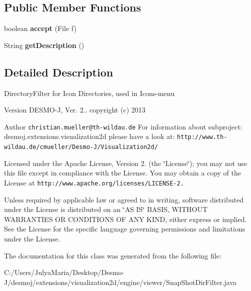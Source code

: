 \subsection*{Public Member Functions}
\begin{DoxyCompactItemize}
\item 
boolean {\bfseries accept} (File f)\label{classdesmoj_1_1extensions_1_1visualization2d_1_1engine_1_1viewer_1_1_snap_shot_dir_filter_abe949b1113d24862002284462e9a185e}

\item 
String {\bfseries get\-Description} ()\label{classdesmoj_1_1extensions_1_1visualization2d_1_1engine_1_1viewer_1_1_snap_shot_dir_filter_a44fd23ae6b5a6d161ec1302931feec11}

\end{DoxyCompactItemize}


\subsection{Detailed Description}
Directory\-Filter for Icon Directories, used in Icons-\/menu

\begin{DoxyVersion}{Version}
D\-E\-S\-M\-O-\/\-J, Ver. 2.. copyright (c) 2013 
\end{DoxyVersion}
\begin{DoxyAuthor}{Author}
{\tt christian.\-mueller@th-\/wildau.\-de} For information about subproject\-: desmoj.\-extensions.\-visualization2d please have a look at\-: {\tt http\-://www.\-th-\/wildau.\-de/cmueller/\-Desmo-\/\-J/\-Visualization2d/}
\end{DoxyAuthor}
Licensed under the Apache License, Version 2. (the \char`\"{}\-License\char`\"{}); you may not use this file except in compliance with the License. You may obtain a copy of the License at {\tt http\-://www.\-apache.\-org/licenses/\-L\-I\-C\-E\-N\-S\-E-\/2.}

Unless required by applicable law or agreed to in writing, software distributed under the License is distributed on an \char`\"{}\-A\-S I\-S\char`\"{} B\-A\-S\-I\-S, W\-I\-T\-H\-O\-U\-T W\-A\-R\-R\-A\-N\-T\-I\-E\-S O\-R C\-O\-N\-D\-I\-T\-I\-O\-N\-S O\-F A\-N\-Y K\-I\-N\-D, either express or implied. See the License for the specific language governing permissions and limitations under the License. 

The documentation for this class was generated from the following file\-:\begin{DoxyCompactItemize}
\item 
C\-:/\-Users/\-Julya\-Maria/\-Desktop/\-Desmo-\/\-J/desmoj/extensions/visualization2d/engine/viewer/Snap\-Shot\-Dir\-Filter.\-java\end{DoxyCompactItemize}
